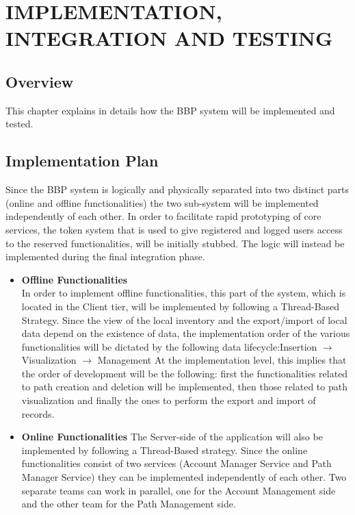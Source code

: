 \section{IMPLEMENTATION, INTEGRATION AND TESTING}

\subsection{Overview}
This chapter explains in details how the BBP system will be implemented and tested.
\subsection{Implementation Plan}
Since the BBP system is logically and physically separated into two distinct parts (online and offline functionalities) the two sub-system will be implemented independently of each other.
\newline\newline
In order to facilitate rapid prototyping of core services, the token system that is used to give registered and logged users access to the reserved functionalities, will be initially stubbed. The logic will instead be implemented during the final integration phase.
\begin{itemize}
    \item \textbf{Offline Functionalities}\\
    In order to implement offline functionalities, this
    part of the system, which is located in the Client tier, will be implemented by
    following a Thread-Based Strategy. Since the view of the local inventory 
    and the export/import of local data depend on the existence of data, the implementation order
    of the various functionalities will be dictated by the following data lifecycle:\newline\newline Insertion $\to$ Visualization $\to$ Management\newline\newline
    At the implementation level, this implies that the order of development will be the following: first the functionalities related to path creation and deletion will be implemented, then those related
    to path visualization and finally the ones to perform the export and import of records.
    \item \textbf{Online Functionalities}
    The Server-side of the application will also be implemented by following a Thread-Based strategy.\newline
    Since the online functionalities consist of two services (Account Manager Service and Path Manager Service) they can be
    implemented independently of each other. Two separate teams can work in parallel, one for the Account Management side and the
    other team for the Path Management side.
\end{itemize}
